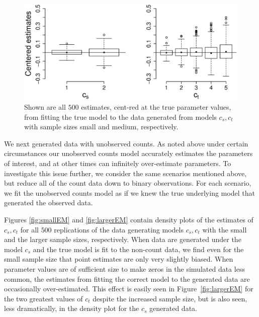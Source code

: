 \documentclass[12pt]{article}
\begin{document}
\begin{figure}
  \centering
  \includegraphics[scale=0.5]{bp}
  \caption{Shown are all $500$ estimates, cent-red at the true parameter values, from fitting the true model to the data generated from models $c_s,c_t$ with sample sizes small and medium, respectively.}
  \label{fig:bp}
\end{figure}

We next generated data with unobserved counts.  As noted above under certain circumstances our unobserved counts model accurately estimates the parameters of interest, and at other times can infinitely over-estimate parameters.  To investigate this issue further, we consider the same scenarios mentioned above, but reduce all of the count data down to binary observations.  For each scenario, we fit the unobserved counts model as if we knew the true underlying model that generated the observed data.

Figures \ref{fig:smallEM} and \ref{fig:largerEM} contain density plots of the estimates of $c_s, c_t$ for all $500$ replications of the data generating models $c_s,c_t$ with the small and the larger sample sizes, respectively.  When data are generated under the model $c_s$ and the true model is fit to the non-count data, we find even for the small sample size that point estimates are only very slightly biased.  When parameter values are of sufficient size to make zeros in the simulated data less common, the estimates from fitting the correct model to the generated data are occasionally over-estimated.  This effect is easily seen in Figure~\ref{fig:largerEM} for the two greatest values of $c_t$ despite the increased sample size, but is also seen, less dramatically, in the density plot for the $c_s$ generated data.  
\end{document}
